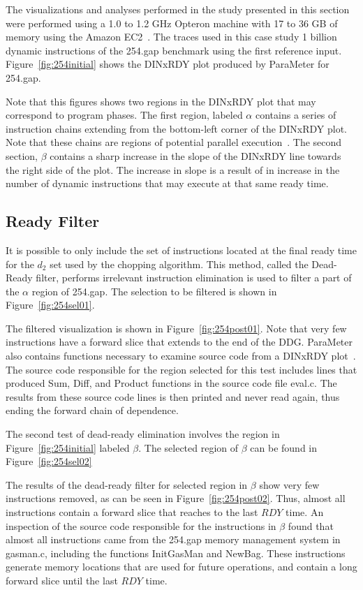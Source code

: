 {The visualizations and analyses performed in the study presented in this section were performed using a 1.0 to 1.2 GHz Opteron machine with 17 to 36 GB of memory using the Amazon EC2~\cite{ec2:10:web}. The traces used in this case study 1 billion dynamic instructions of the 254.gap benchmark using the first reference input. Figure~\ref{fig:254initial} shows the DINxRDY plot produced by ParaMeter for 254.gap.

Note that this figures shows two regions in the DINxRDY plot that may correspond to program phases.  The first region, labeled $\alpha$ contains a series of instruction chains extending from the bottom-left corner of the DINxRDY plot.  Note that these chains are regions of potential parallel execution~\cite{price:08:pact}. The second section, $\beta$ contains a sharp increase in the slope of the DINxRDY line towards the right side of the plot.  The increase in slope is a result of in increase in the number of dynamic instructions that may execute at that same ready time.

\subsection {Ready Filter}

It is possible to only include the set of instructions located at the final ready time for the $d_2$ set used by the chopping algorithm. This method, called the Dead-Ready filter, performs irrelevant instruction elimination is used to filter a part of the $\alpha$ region of 254.gap.  The selection to be filtered is shown in Figure~\ref{fig:254sel01}.

The filtered visualization is shown in Figure~\ref{fig:254post01}. Note that very few instructions have a forward slice that extends to the end of the DDG.  ParaMeter also contains functions necessary to examine source code from a DINxRDY plot~\cite{price:08:pact}.  The source code responsible for the region selected for this test includes lines that produced Sum, Diff, and Product functions in the source code file eval.c.  The results from these source code lines is then printed and never read again, thus ending the forward chain of dependence.

The second test of dead-ready elimination involves the region in Figure~\ref{fig:254initial} labeled $\beta$.  The selected region of $\beta$ can be found in Figure~\ref{fig:254sel02}

The results of the dead-ready filter for selected region in $\beta$ show very few instructions removed, as can be seen in Figure~\ref{fig:254post02}. Thus, almost all instructions contain a forward slice that reaches to the last $RDY$ time.  An inspection of the source code responsible for the instructions in $\beta$ found that almost all instructions came from the 254.gap memory management system in gasman.c, including the functions InitGasMan and NewBag.  These instructions generate memory locations that are used for future operations, and contain a long forward slice until the last $RDY$ time.

}
